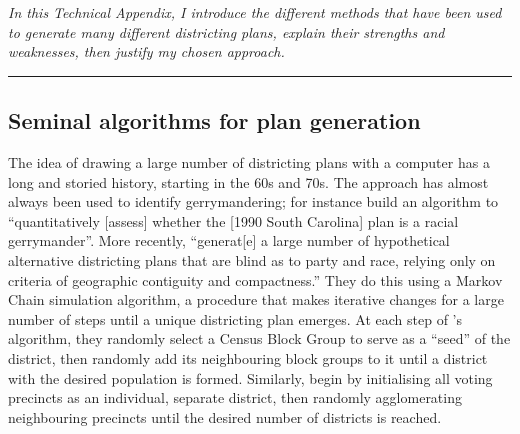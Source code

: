 \documentclass[]{article}
\begin{document}
\textsl{In this Technical Appendix, I introduce the different methods that have
been used to generate many different districting plans, explain their strengths
and weaknesses, then justify my chosen approach.}

\begin{center}\rule{0.5\linewidth}{\linethickness}\end{center}

\hypertarget{seminal-algorithms-for-plan-generation}{%
\subsection{Seminal algorithms for plan
generation}\label{seminal-algorithms-for-plan-generation}}

The idea of drawing a large number of districting plans with a computer
has a long and storied history, starting in the 60s and 70s. The
approach has almost always been used to identify gerrymandering; for
instance \cite{ccd2000} build an algorithm to ``quantitatively
{[}assess{]} whether the {[}1990 South Carolina{]} plan is a racial
gerrymander''. More recently, \cite{cr2013} ``generat{[}e{]} a large
number of hypothetical alternative districting plans that are blind as
to party and race, relying only on criteria of geographic contiguity and
compactness.'' They do this using a Markov Chain simulation algorithm, a
procedure that makes iterative changes for a large number of steps until
a unique districting plan emerges. At each step of
\citeauthor{ccd2000}'s algorithm, they randomly select a Census Block
Group to serve as a ``seed'' of the district, then randomly add its
neighbouring block groups to it until a district with the desired
population is formed. Similarly, \citeauthor{cr2013} begin by
initialising all voting precincts as an individual, separate district,
then randomly agglomerating neighbouring precincts until the desired
number of districts is reached.
\end{document}
